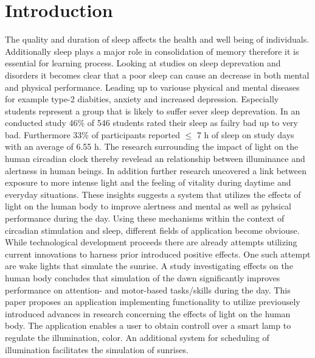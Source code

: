 \documentclass[conference]{IEEEtran}
\begin{document}
\section{Introduction}
The quality and duration of sleep affects the health and well being of individuals.
Additionally sleep plays a major role in consolidation of memory \cite{Rauchs2005} therefore it is essential for learning process.
Looking at studies on sleep deprevation and disorders it becomes clear that a poor sleep can cause an decrease in both
mental and physical performance. \cite{Mirghani2015a, Antunes2017a} Leading up to variouse physical and mental
diseases for example type-2 diabities, anxiety and increased depression. Especially students represent a group that 
is likely to suffer sever sleep deprevation. In an conducted study 46\% of 546 students rated their sleep as failry bad up to 
very bad. Furthermore 33\% of participants reported $\leq$ 7 h of sleep on study days with an average of 6.55 h. \cite{Norbury2019a}
The research surrounding the impact of light on the human circadian clock thereby revelead an relationship between illuminance and
alertness in human beings. \cite{DuffyJeanne2009a} In addition further research uncovered a link between exposure to more intense
light and the feeling of vitality during daytime and everyday situations. \cite{Smolders2014a}
These insights suggests a system that utilizes the effects of light on the human body to improve alertness and mental as well as
pyhsical performance during the day. Using these mechanisms within the context of circadian stimulation and sleep, different
fields of application become obviouse.
While technological development proceeds there are already attempts utilizing current innovations to harness prior introduced 
positive effects. One such attempt are wake lights that simulate the sunrise. A study investigating effects on the human body
concludes that simulation of the dawn significantly improves performance on attention- and motor-based tasks/skills during the day.
\cite{Gabel2015a}
This paper proposes an application implementing functionality to utilize previousely introduced advances in research 
concerning the effects of light on the human body. The application enables a user to obtain controll over a smart lamp
to regulate the illumination, color. An additional system for scheduling of illumination facilitates the simulation of sunrises.
\end{document}
